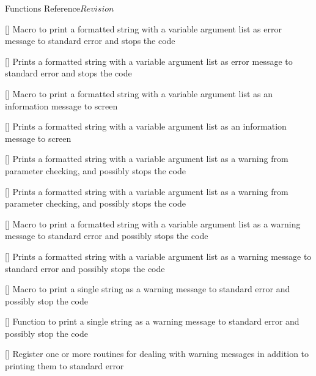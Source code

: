\begin{cactuspart}{ Functions Reference}{}{$Revision$}
\begin{Lentry}
\item[\code{CCTK\_VERROR}] [\pageref{CCTK-VERROR}]
  Macro to print a formatted string with a variable argument list as
  error message to standard error and stops the code

\item[\code{CCTK\_VError}] [\pageref{CCTK-VError}]
  Prints a formatted string with a variable argument list as error
  message to standard error and stops the code

\item[\code{CCTK\_VINFO}] [\pageref{CCTK-VINFO}]
  Macro to print a formatted string with a variable argument list as
  an information message to screen

\item[\code{CCTK\_VInfo}] [\pageref{CCTK-VInfo}]
  Prints a formatted string with a variable argument list as an information
  message to screen

\item[\code{CCTK\_VPARAMWARN}] [\pageref{CCTK-VPARAMWARN}]
  Prints a formatted string with a variable argument list as a warning from
  parameter checking, and possibly stops the code

\item[\code{CCTK\_VParamWarn}] [\pageref{CCTK-VParamWarn}]
  Prints a formatted string with a variable argument list as a warning from
  parameter checking, and possibly stops the code

\item[\code{CCTK\_VWARN}] [\pageref{CCTK-VWARN}]
  Macro to print a formatted string with a variable argument list as a
  warning message to standard error and possibly stops the code

\item[\code{CCTK\_VWarn}] [\pageref{CCTK-VWarn}]
  Prints a formatted string with a variable argument list as a warning message
  to standard error and possibly stops the code

\item[\code{CCTK\_WARN}] [\pageref{CCTK-WARN}]
  Macro to print a single string as a warning message to standard error and
  possibly stop the code

\item[\code{CCTK\_Warn}] [\pageref{CCTK-Warn}]
  Function to print a single string as a warning message to standard error and
  possibly stop the code

\item[\code{CCTK\_WarnCallbackRegister}] [\pageref{CCTK-WARNCallbackRegister}]
  Register one or more routines for dealing with warning messages in addition
  to printing them to standard error


\end{Lentry}
\end{cactuspart}
